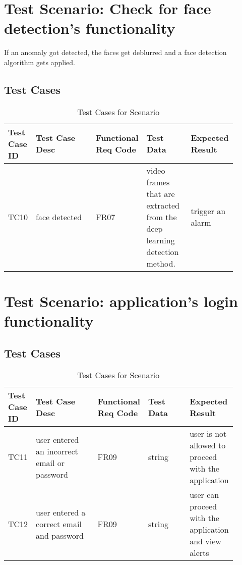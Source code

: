 \documentclass[12pt]{article}
\begin{document}
\section{Test Scenario: Check for face detection's functionality}\label{sec:TSy}
If an anomaly got detected, the faces get deblurred and a face detection algorithm gets applied.
\subsection{Test Cases}
\begin{table}[h]
\caption{Test Cases for Scenario}
\label{tab:TC1}
\begin{tabular}{|p{0.1\linewidth}|p{0.3\linewidth}|p{0.1\linewidth}|p{0.2\linewidth}|p{0.2\linewidth}|}
\hline
Test Case ID & Test Case Desc & Functional Req Code & Test Data & Expected Result \\ \hline
TC10  & face detected & FR07 &  video frames that are extracted from the deep learning detection method.   & trigger an alarm                \\ \hline

\end{tabular}
\end{table}

\section{Test Scenario: application's login functionality}\label{sec:TSy}
\subsection{Test Cases}
\begin{table}[h]
\caption{Test Cases for Scenario}
\label{tab:TC1}
\begin{tabular}{|p{0.1\linewidth}|p{0.3\linewidth}|p{0.1\linewidth}|p{0.2\linewidth}|p{0.2\linewidth}|}
\hline
Test Case ID & Test Case Desc & Functional Req Code & Test Data & Expected Result \\ \hline
TC11  & user entered an incorrect email or password & FR09 & string   & user is not allowed to proceed with the application               \\ \hline
TC12 & user entered a correct email and password   & FR09    &  string      &  user can proceed with the application and view alerts          \\ \hline

\end{tabular}
\end{table}
\newpage
\end{document}
